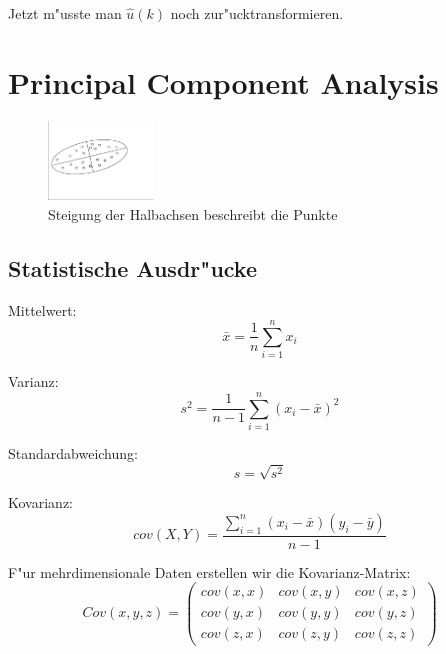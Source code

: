 \documentclass[german, 10pt, a4paper, twocolumn]{scrartcl}
\begin{document}
Jetzt m"usste man $\hat{u}(k)$ noch zur"ucktransformieren.

\section{Principal Component Analysis}

\begin{figure}[hbt]
 \begin{center}
 	\includegraphics[width=0.25\textwidth]{principalcomp.eps}
 \end{center}
 \label{principal_components}
 \caption{Steigung der Halbachsen beschreibt die Punkte}
\end{figure}

\subsection{Statistische Ausdr"ucke}

Mittelwert:
\begin{displaymath}
	\bar{x} = \frac{1}{n}\sum^n_{i=1} x_i
\end{displaymath}

Varianz:
\begin{displaymath}
	s^2 = \frac{1}{n-1}\sum^n_{i=1}(x_i-\bar{x})^2
\end{displaymath}

Standardabweichung:
\begin{displaymath}
	s = \sqrt{s^2}
\end{displaymath}

Kovarianz:
\begin{displaymath}
	cov(X,Y) = \frac{\sum^n_{i=1}(x_i-\bar{x})(y_i-\bar{y})}{n-1}
\end{displaymath}

F"ur mehrdimensionale Daten erstellen wir die Kovarianz-Matrix:
\begin{displaymath}
	Cov(x,y,z) = 	\left (
				\begin{array}{ccc}
					cov(x,x) &	cov(x,y) &	cov(x,z)\\
					cov(y,x) &	cov(y,y) &	cov(y,z)\\
					cov(z,x) &	cov(z,y) &	cov(z,z)
				\end{array}
			\right )
\end{displaymath}
\end{document}
